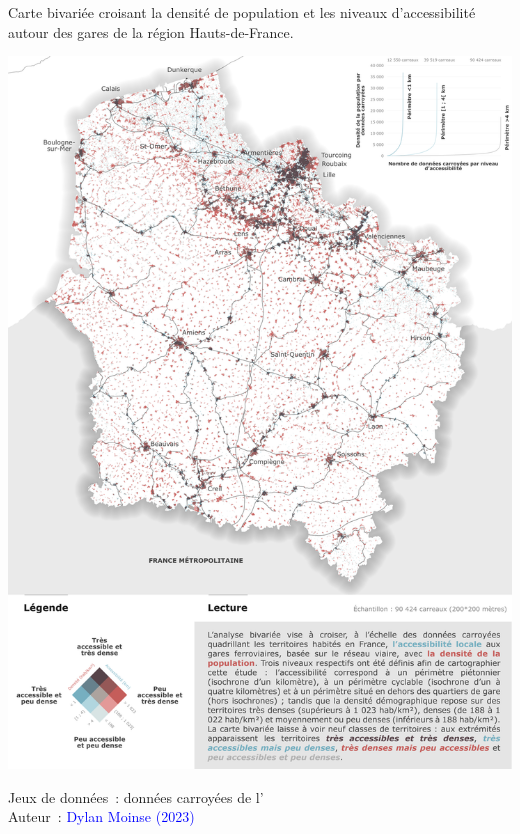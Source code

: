 \begin{refsegment}
    \begin{carte}[h!]\vspace*{4pt}
        \caption{Carte bivariée croisant la densité de population et les niveaux d'accessibilité autour des gares de la région Hauts-de-France.}
        \label{fig-chap5:carte-bivariee-accessibilite-densite}
        \centerline{\includegraphics[width=1\columnwidth]{src/Figures/Chap-5/FR_Distances_Carte_bivariee_accessibilite_densite.png}}
        \vspace{5pt}
        \begin{flushright}\scriptsize{
        Jeux de données~: données carroyées de l'\textcolor{blue}{\textcite{insee_grille_2021}}
        \\
        Auteur~: \textcolor{blue}{Dylan Moinse (2023)}
        }\end{flushright}
    \end{carte}
    

\end{refsegment}
